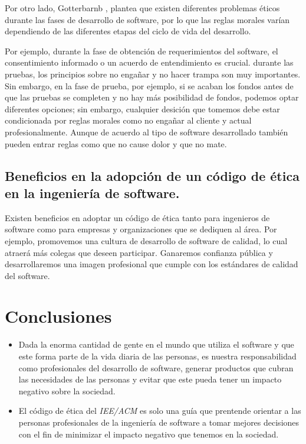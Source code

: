 \documentclass[twoside]{article}
\begin{document}
\begin{multicols}{2}
Por otro lado, Gotterbarnb \cite{gotterbarn2001software}, plantea que existen
diferentes problemas éticos durante las fases de desarrollo de software, por lo
que las reglas morales varían dependiendo de las diferentes etapas del ciclo de
vida del desarrollo.

Por ejemplo, durante la fase de obtención de requerimientos del software, el
consentimiento informado o un acuerdo de entendimiento es crucial. durante las
pruebas, los principios sobre no engañar y no hacer trampa son muy importantes.
Sin embargo, en la fase de prueba, por ejemplo, si se acaban los fondos antes de
que las pruebas se completen y no hay más posibilidad de fondos, podemos optar
diferentes opciones; sin embargo, cualquier desición que tomemos debe estar
condicionada por reglas morales como no engañar al cliente y actual
profesionalmente. Aunque de acuerdo al tipo de software desarrollado también
pueden entrar reglas como que no cause dolor y que no mate.


\subsection{Beneficios en la adopción de un código de ética en la ingeniería de software.}

Existen beneficios en adoptar un código de ética tanto para ingenieros de
software como para empresas y organizaciones que se dediquen al área. Por
ejemplo, promovemos una cultura de desarrollo de software de calidad, lo cual
atraerá más colegas que deseen participar. Ganaremos confianza pública y
desarrollaremos una imagen profesional que cumple con los estándares de calidad
del software.



\pagebreak

\section{Conclusiones}

\begin{itemize}
\item Dada la enorma cantidad de gente en el mundo que utiliza el software y
que este forma parte de la vida diaria de las personas, es nuestra
responsabilidad como profesionales del desarrollo de software, generar productos
que cubran las necesidades de las personas y evitar que este pueda tener un
impacto negativo sobre la sociedad.

\item El código de ética del \textit{IEE/ACM} es solo una guía que prentende
orientar a las personas profesionales de la ingeniería de software a tomar
mejores decisiones con el fin de minimizar el impacto negativo que tenemos en la
sociedad.



\end{itemize}
\end{multicols}
\end{document}
